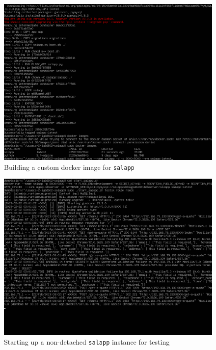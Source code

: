 \begin{figure}[h!]
\centering
\captionsetup{skip=\skipfigurecaptionlen}
\includegraphics[width=1\textwidth]{screenshots/IY2D502-2019-02-21-23-43-07.png}
\caption{Building a custom docker image for \texttt{salapp}}
\label{fig:IY2D502-2019-02-21-23-43-07}
\end{figure}
\pagebreak
\begin{figure}[h!]
\centering
\captionsetup{skip=\skipfigurecaptionlen}
\includegraphics[width=1\textwidth]{screenshots/IY2D502-2019-02-22-03-02-25.png}
\caption{Starting up a non-detached \texttt{salapp} instance for testing}
\label{fig:IY2D502-2019-02-22-03-02-25}
\end{figure}

